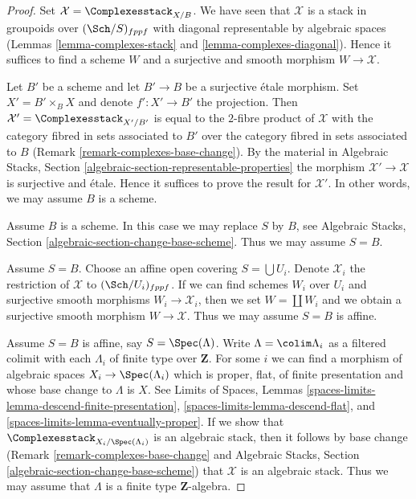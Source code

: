 \begin{proof}
Set $\mathcal{X} = \Complexesstack_{X/B}$. We have seen that $\mathcal{X}$
is a stack in groupoids over $(\Sch/S)_{fppf}$ with diagonal representable
by algebraic spaces
(Lemmas \ref{lemma-complexes-stack} and \ref{lemma-complexes-diagonal}).
Hence it suffices to find a scheme $W$ and a surjective and smooth
morphism $W \to \mathcal{X}$.

\medskip\noindent
Let $B'$ be a scheme and let $B' \to B$ be a surjective \'etale morphism.
Set $X' = B' \times_B X$ and denote $f' : X' \to B'$ the projection.
Then $\mathcal{X}' = \Complexesstack_{X'/B'}$ is equal to the $2$-fibre
product of $\mathcal{X}$ with the category fibred in sets
associated to $B'$ over the category fibred in sets associated to $B$
(Remark \ref{remark-complexes-base-change}). By the material in
Algebraic Stacks, Section \ref{algebraic-section-representable-properties}
the morphism $\mathcal{X}' \to \mathcal{X}$ is surjective and \'etale.
Hence it suffices to prove the result for $\mathcal{X}'$.
In other words, we may assume $B$ is a scheme.

\medskip\noindent
Assume $B$ is a scheme. In this case we may replace $S$ by $B$, see
Algebraic Stacks, Section \ref{algebraic-section-change-base-scheme}.
Thus we may assume $S = B$.

\medskip\noindent
Assume $S = B$. Choose an affine open covering $S = \bigcup U_i$.
Denote $\mathcal{X}_i$ the restriction of $\mathcal{X}$ to
$(\Sch/U_i)_{fppf}$. If we can find schemes $W_i$ over $U_i$ and
surjective smooth morphisms $W_i \to \mathcal{X}_i$, then we
set $W = \coprod W_i$ and we obtain a surjective smooth morphism
$W \to \mathcal{X}$. Thus we may assume $S = B$ is affine.

\medskip\noindent
Assume $S = B$ is affine, say $S = \Spec(\Lambda)$.
Write $\Lambda = \colim \Lambda_i$ as a filtered colimit with each $\Lambda_i$
of finite type over $\mathbf{Z}$. For some $i$ we can find
a morphism of algebraic spaces $X_i \to \Spec(\Lambda_i)$
which is proper, flat, of finite presentation and whose base change
to $\Lambda$ is $X$. See Limits of Spaces, Lemmas
\ref{spaces-limits-lemma-descend-finite-presentation},
\ref{spaces-limits-lemma-descend-flat}, and
\ref{spaces-limits-lemma-eventually-proper}.
If we show that $\Complexesstack_{X_i/\Spec(\Lambda_i)}$ is an
algebraic stack, then it follows by base change
(Remark \ref{remark-complexes-base-change} and
Algebraic Stacks, Section \ref{algebraic-section-change-base-scheme})
that $\mathcal{X}$ is an algebraic stack.
Thus we may assume that $\Lambda$ is a finite type $\mathbf{Z}$-algebra.


\end{proof}
